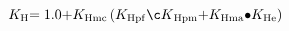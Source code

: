 \begin{equation}
K_{\mathrm{H}}\mathrm{=1.0+}K_{\mathrm{Hmc}}\left(K_{\mathrm{Hpf}}{\mathrm{\c }K}_{\mathrm{Hpm}}\mathrm{+}K_{\mathrm{Hma}}\mathrm{\bullet }K_{\mathrm{He}}\right)
\end{equation}